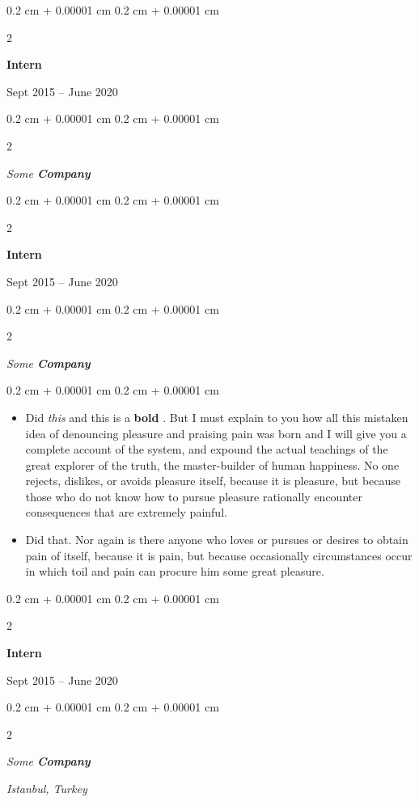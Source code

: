 \documentclass[10pt, letterpaper]{article}
\newenvironment{highlights}{
    \begin{itemize}[
        topsep=0.10 cm,
        parsep=0.10 cm,
        partopsep=0pt,
        itemsep=0pt,
        leftmargin=0.4 cm + 10pt
    ]
}{
    \end{itemize}
} %
\newenvironment{onecolentry}{
    \begin{adjustwidth}{
        0.2 cm + 0.00001 cm
    }{
        0.2 cm + 0.00001 cm
    }
}{
    \end{adjustwidth}
} %
\newenvironment{twocolentry}[2][]{
    \onecolentry
    \def\secondColumn{#2}
    \setcolumnwidth{\fill, 4.5 cm}
    \begin{paracol}{2}
}{
    \switchcolumn \raggedleft \secondColumn
    \end{paracol}
    \endonecolentry
} %
\let\hrefWithoutArrow\href
\renewcommand{\href}[2]{\hrefWithoutArrow{#1}{\ifthenelse{\equal{#2}{}}{ }{#2 }\raisebox{.15ex}{\footnotesize \faExternalLink*}}}
\begin{document}
                \begin{twocolentry}{
                    Sept 2015 – June 2020
                }
                \textbf{Intern}
                \end{twocolentry}
            \begin{twocolentry}{
            }
            \textit{Some \textbf{Company}}
            \end{twocolentry}



        \vspace{0.2 cm}

                \begin{twocolentry}{
                    Sept 2015 – June 2020
                }
                \textbf{Intern}
                \end{twocolentry}
            \begin{twocolentry}{
            }
            \textit{Some \textbf{Company}}
            \end{twocolentry}

        \vspace{0.10 cm}
        \begin{onecolentry}
            \begin{highlights}
                \item Did \textit{this} and this is a \textbf{bold} \href{https://example.com}{link}. But I must explain to you how all this mistaken idea of denouncing pleasure and praising pain was born and I will give you a complete account of the system, and expound the actual teachings of the great explorer of the truth, the master-builder of human happiness. No one rejects, dislikes, or avoids pleasure itself, because it is pleasure, but because those who do not know how to pursue pleasure rationally encounter consequences that are extremely painful.
                \item Did that. Nor again is there anyone who loves or pursues or desires to obtain pain of itself, because it is pain, but because occasionally circumstances occur in which toil and pain can procure him some great pleasure.
            \end{highlights}
        \end{onecolentry}


        \vspace{0.2 cm}

                \begin{twocolentry}{
                    Sept 2015 – June 2020
                }
                \textbf{Intern}
                \end{twocolentry}
            \begin{twocolentry}{
        \textit{Istanbul, Turkey}    }
            \textit{Some \textbf{Company}}
            \end{twocolentry}
\end{document}
